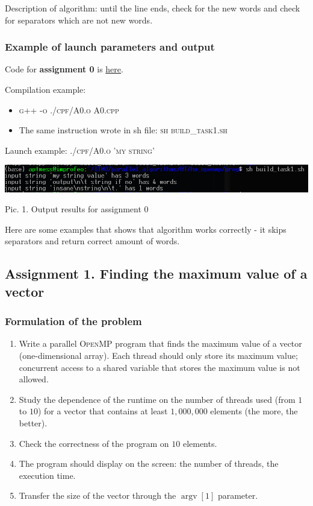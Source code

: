 \documentclass[%
12pt, %
final, %
oneside, %
onecolumn, %
centertags]{article} %
\theoremstyle{plain}
\theoremstyle{definition}
\theoremstyle{remark}
\begin{document}
Description of algorithm: until the line ends, check for the new words and check for separators which are not new words.

\subsubsection{Example of launch parameters and output}

Code for \textbf{assignment 0} is \href{https:\//github.com/aptmess/parallel_algorithms/blob/master/HT/hw_openmp/prog/A0.cpp}{here}.

Compilation example: 

\begin{itemize}
	\item \textsc{g++ -o ./cpf/A0.o A0.cpp}
	\item The same instruction wrote in sh file: \textsc{sh build\_task1.sh}
\end{itemize}

Launch example: \textsc{./cpf/A0.o 'my string'}

\begin{center}
\includegraphics[scale=0.8]{t1.png}

Pic. 1. Output results for assignment 0
\end{center}

Here are some examples that shows that algorithm works correctly - it skips separators and return correct amount of words.

\newpage

\subsection{Assignment 1. Finding the maximum value of a vector}

\subsubsection{Formulation of the problem}

\begin{enumerate}
	\item Write a parallel \textsc{OpenMP} program that finds the maximum value of a vector (one-dimensional array). Each thread should only store its maximum value; concurrent access to a shared variable that stores the maximum value is not allowed.
	\item Study the dependence of the runtime on the number of threads used (from $1$ to $10$) for a vector that contains at least $1,000,000$ elements (the more, the better).
	\item Check the correctness of the program on $10$ elements.
	\item The program should display on the screen: the number of threads, the execution 
time.
	\item Transfer the size of the vector through the $\operatorname{argv} [1]$ parameter.
\end{enumerate}
\end{document}
